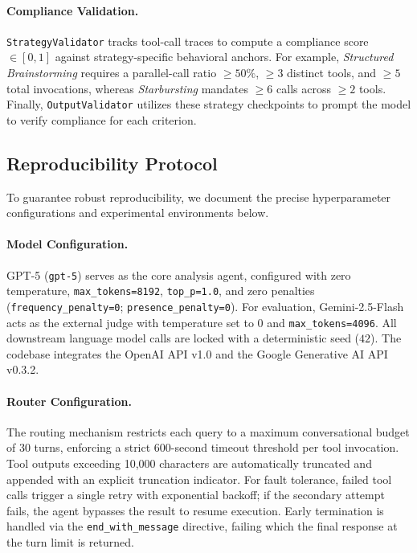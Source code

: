\paragraph{Compliance Validation.}
\texttt{StrategyValidator} tracks tool-call traces to compute a compliance score $\in [0,1]$ against strategy-specific behavioral anchors. For example, \emph{Structured Brainstorming} requires a parallel-call ratio $\ge 50\%$, $\ge 3$ distinct tools, and $\ge 5$ total invocations, whereas \emph{Starbursting} mandates $\ge 6$ calls across $\ge 2$ tools. Finally, \texttt{OutputValidator} utilizes these strategy checkpoints to prompt the model to verify compliance for each criterion.

\subsection{Reproducibility Protocol}
\label{app:reproducibility}

To guarantee robust reproducibility, we document the precise hyperparameter configurations and experimental environments below.

\paragraph{Model Configuration.}
GPT-5 (\texttt{gpt-5}) serves as the core analysis agent, configured with zero temperature, \texttt{max\_tokens=8192}, \texttt{top\_p=1.0}, and zero penalties (\texttt{frequency\_penalty=0}; \texttt{presence\_penalty=0}). For evaluation, Gemini-2.5-Flash acts as the external judge with temperature set to $0$ and \texttt{max\_tokens=4096}. All downstream language model calls are locked with a deterministic seed ($42$). The codebase integrates the OpenAI API v1.0 and the Google Generative AI API v0.3.2.

\paragraph{Router Configuration.}
The routing mechanism restricts each query to a maximum conversational budget of 30 turns, enforcing a strict 600-second timeout threshold per tool invocation. Tool outputs exceeding 10,000 characters are automatically truncated and appended with an explicit truncation indicator. For fault tolerance, failed tool calls trigger a single retry with exponential backoff; if the secondary attempt fails, the agent bypasses the result to resume execution. Early termination is handled via the \texttt{end\_with\_message} directive, failing which the final response at the turn limit is returned.

